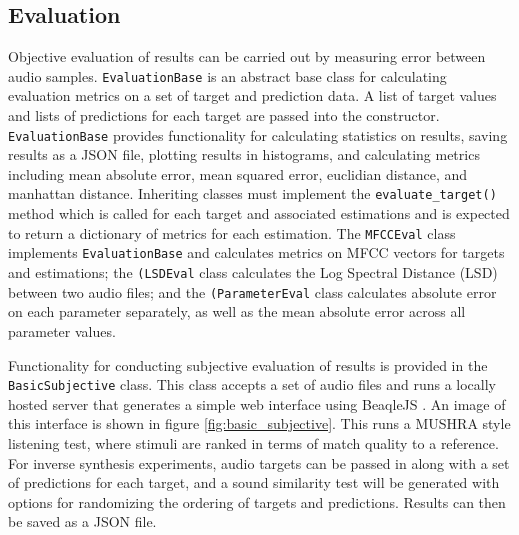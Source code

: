 \subsection{Evaluation}
Objective evaluation of results can be carried out by measuring error between audio samples. \texttt{EvaluationBase} is an abstract base class for calculating evaluation metrics on a set of target and prediction data. A list of target values and lists of predictions for each target are passed into the constructor. \texttt{EvaluationBase} provides functionality for calculating statistics on results, saving results as a JSON file, plotting results in histograms, and calculating metrics including mean absolute error, mean squared error, euclidian distance, and manhattan distance. Inheriting classes must implement the \texttt{evaluate_target()} method which is called for each target and associated estimations and is expected to return a dictionary of metrics for each estimation. The \texttt{MFCCEval} class implements \texttt{EvaluationBase} and calculates metrics on MFCC vectors for targets and estimations; the \texttt{(LSDEval} class calculates the Log Spectral Distance (LSD) between two audio files; and the \texttt{(ParameterEval} class calculates absolute error on each parameter separately, as well as the mean absolute error across all parameter values.

Functionality for conducting subjective evaluation of results is provided in the \texttt{BasicSubjective} class. This class accepts a set of audio files and runs a locally hosted server that generates a simple web interface using BeaqleJS \cite{kraft2014beaqlejs}. An image of this interface is shown in figure \ref{fig:basic_subjective}. This runs a MUSHRA style listening test, where stimuli are ranked in terms of match quality to a reference.  For inverse synthesis experiments, audio targets can be passed in along with a set of predictions for each target, and a sound similarity test will be generated with options for randomizing the ordering of targets and predictions. Results can then be saved as a JSON file.

